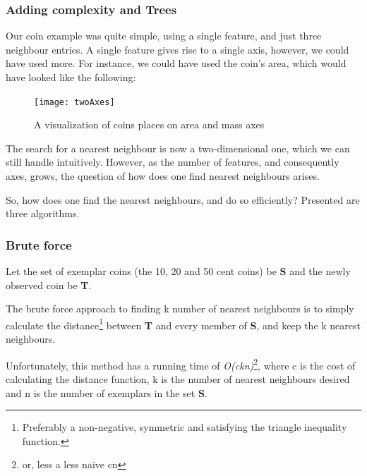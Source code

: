 \documentclass[a4paper, 12pt]{article}
\begin{document}
            \newpage


            \subsubsection{Adding complexity and Trees}

                \par Our coin example was quite simple, using a single feature, and just three neighbour entries. A single feature gives rise to a single axis, however, we could have used more. For instance, we could have used the coin's area, which would have looked like the following:
                
                \begin{figure}[h]
                    \caption{A visualization of coins places on area and mass axes}
                    \centering
                    \texttt{[image: twoAxes]}
                \end{figure}

                \par The search for a nearest neighbour is now a two-dimensional one, which we can still handle intuitively. However, as the number of features, and consequently axes, grows, the question of how does one find nearest neighbours arises.

                \par So, how does one find the nearest neighbours, and do so efficiently? Presented are three algorithms.
                
                
                \subsubsection{Brute force}
                
                    \par Let the set of exemplar coins (the 10, 20 and 50 cent coins) be \textbf{S} and the newly observed coin be \textbf{T}. 
                    
                    \par The brute force approach to finding k number of nearest neighbours is to simply calculate the distance\footnote{Preferably a non-negative, symmetric and satisfying the triangle inequality function.} between \textbf{T} and every member of \textbf{S}, and keep the k nearest neighbours.
                    
                    \par Unfortunately, this method has a running time of \textit{O(ckn)}\footnote{or, less a less naive cn}, where c is the cost of calculating the distance function, k is the number of nearest neighbours desired and n is the number of exemplars in the set \textbf{S}.
                    
\end{document}
